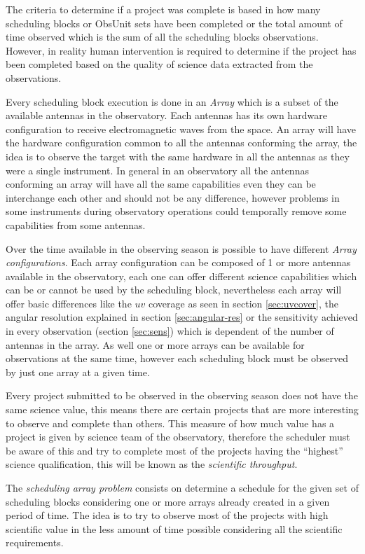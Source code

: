 \documentclass[11pt]{article}
\begin{document}
The criteria to determine if a project was complete is based in how many scheduling blocks or ObsUnit sets have been completed or the total amount of time observed which is the sum of all the scheduling blocks observations. However, in reality human intervention is required to determine if the project has been completed based on the quality of science data extracted from the observations.

Every scheduling block execution is done in an \textit{Array} which is a subset of the available antennas in the observatory. Each antennas has its own hardware configuration to receive electromagnetic waves from the space. An array will have the hardware configuration common to all the antennas conforming the array, the idea is to observe the target with the same hardware in all the antennas as they were a single instrument. In general in an observatory all the antennas conforming an array will have all the same capabilities even they can be interchange each other and should not be any difference, however problems in some instruments during observatory operations could temporally remove some capabilities from some antennas.

Over the time available in the observing season is possible to have different \textit{Array configurations}. Each array configuration can be composed of 1 or more antennas available in the observatory, each one can offer different science capabilities which can be or cannot be used by the scheduling block, nevertheless each array will offer basic differences like the $uv$ coverage as seen in section \ref{sec:uvcover}, the angular resolution explained in section \ref{sec:angular-res} or the sensitivity achieved in every observation (section \ref{sec:sens}) which is dependent of the number of antennas in the array. As well one or more arrays can be available for observations at the same time, however each scheduling block must be observed by just one array at a given time.

Every project submitted to be observed in the observing season does not have the same science value, this means there are certain projects that are more interesting to observe and complete than others. This measure of how much value has a project is given by science team of the observatory, therefore the scheduler must be aware of this and try to complete most of the projects having the ``highest'' science qualification, this will be known as the \textit{scientific throughput}.

The \textit{scheduling array problem} consists on determine a schedule for the given set of scheduling blocks considering one or more arrays already created in a given period of time. The idea is to try to observe most of the projects with high scientific value in the less amount of time possible considering all the scientific requirements.
\end{document}
